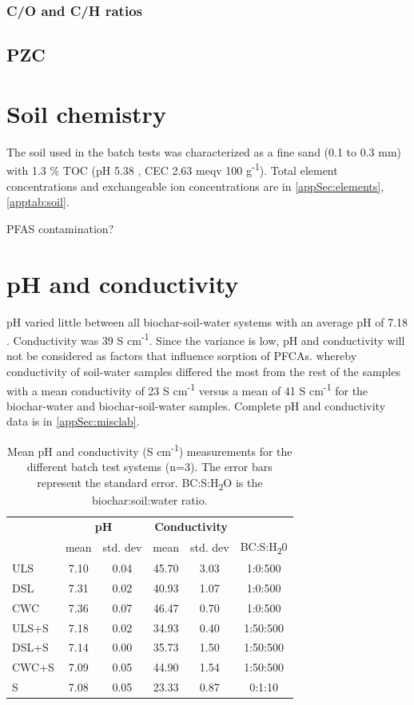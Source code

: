 \subsubsection{C/O and C/H ratios}

\subsection{PZC}

\section{Soil chemistry}
The soil used in the batch tests was characterized as a fine sand (0.1 to 0.3 mm) with 1.3 \% TOC (pH 5.38  , CEC 2.63  meqv 100 g\textsuperscript{-1}). Total element concentrations and exchangeable ion concentrations are in \cref{appSec:elements}, \cref{apptab:soil}. 

PFAS contamination?

\section{pH and conductivity}
pH varied little between all biochar-soil-water systems with an average pH of 7.18 . Conductivity was 39  \textmu S cm\textsuperscript{-1}. Since the variance is low, pH and conductivity will not be considered as factors that influence sorption of PFCAs. whereby conductivity of soil-water samples differed the most from the rest of the samples with a mean conductivity of 23  \textmu S cm\textsuperscript{-1} versus a mean of 41  \textmu S cm\textsuperscript{-1} for the biochar-water and biochar-soil-water samples. Complete pH and conductivity data is in \cref{appSec:misclab}. 

\begin{table}
\centering
\caption{Mean pH and conductivity (\textmu S cm\textsuperscript{-1}) measurements for the different batch test systems (n=3). The error bars represent the standard error. BC:S:H\textsubscript{2}O is the biochar:soil:water ratio.}
\label{tab:pHcond}
\begin{tabular}{lccccc}
\toprule
 & \multicolumn{2}{c}{\textbf{pH}} & \multicolumn{2}{c}{\textbf{Conductivity}} & \\ \cline{2-5}
 & mean & std. dev & mean & std. dev & BC:S:H\textsubscript{2}0\\ 
\midrule
ULS & 7.10 & 0.04 & 45.70 & 3.03 & 1:0:500\\
DSL & 7.31 & 0.02 & 40.93 & 1.07 & 1:0:500\\
CWC & 7.36 & 0.07 & 46.47 & 0.70 & 1:0:500\\
ULS+S & 7.18 & 0.02 & 34.93 & 0.40 & 1:50:500\\
DSL+S & 7.14 & 0.00 & 35.73 & 1.50 & 1:50:500\\
CWC+S & 7.09 & 0.05 & 44.90 & 1.54 & 1:50:500\\
S & 7.08 & 0.05 & 23.33 & 0.87 & 0:1:10\\
\bottomrule
\end{tabular}
\end{table}

